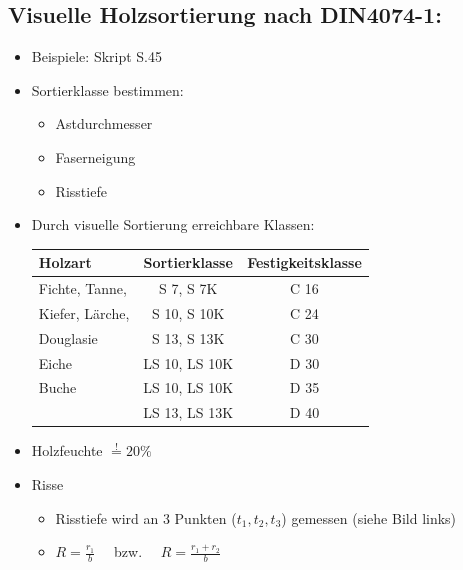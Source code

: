 \documentclass[fleqn,twoside]{article}
\begin{document}
    \subsection{Visuelle Holzsortierung nach DIN4074-1:}
        \begin{itemize}
            \item Beispiele: Skript S.45
            \item Sortierklasse bestimmen:
                \begin{itemize}
                    \item Astdurchmesser
                    \item Faserneigung
                    \item Risstiefe
                \end{itemize}
            \item Durch visuelle Sortierung erreichbare Klassen:\\
                \begin{tabular}{|l|c|c|}
                \hline Holzart & Sortierklasse & Festigkeitsklasse \\
                \hline Fichte, Tanne, & S 7, S 7K & C 16 \\
                        Kiefer, Lärche, & S 10, S 10K & C 24 \\
                        Douglasie & S 13, S 13K & C 30 \\
                \hline Eiche & LS 10, LS 10K & D 30 \\
                \hline Buche & LS 10, LS 10K & D 35 \\
                         & LS 13, LS 13K & D 40 \\
                \hline
                \end{tabular}
            \item Holzfeuchte $\overset{!}{=} 20 \%$
            

            \item Risse
                \begin{itemize}
                    \item Risstiefe wird an 3 Punkten ($t_1,t_2,t_3$) gemessen (siehe Bild links)
                    \item $R=\frac{r_1}{b} \quad$ bzw. $\quad R=\frac{r_1+r_2}{b}$
                \end{itemize}
        \end{itemize}
                
                
\end{document}
